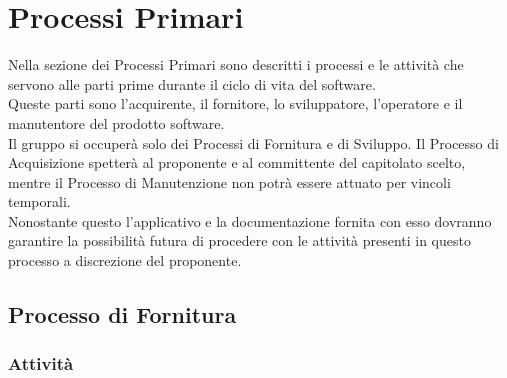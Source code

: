 %



\section{Processi Primari}
Nella sezione dei Processi Primari sono descritti i processi e le attività che servono alle parti prime durante il ciclo di vita del software. \\
Queste parti sono l'acquirente, il fornitore, lo sviluppatore, l'operatore e il manutentore del prodotto software. \\
Il gruppo \groupName{} si occuperà solo dei Processi di Fornitura e di Sviluppo. Il Processo di Acquisizione spetterà al proponente e al committente del capitolato scelto, mentre il Processo di Manutenzione non potrà essere attuato per vincoli temporali. \\
Nonostante questo l'applicativo \projectName{} e la documentazione fornita con esso dovranno garantire la possibilità futura di procedere con le attività presenti in questo processo a discrezione del proponente.

	\subsection{Processo di Fornitura}
		\subsubsection{Attività}
		
